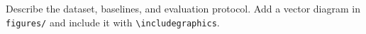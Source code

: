 Describe the dataset, baselines, and evaluation protocol. Add a vector diagram in \texttt{figures/} and include it with \texttt{\textbackslash includegraphics}.
